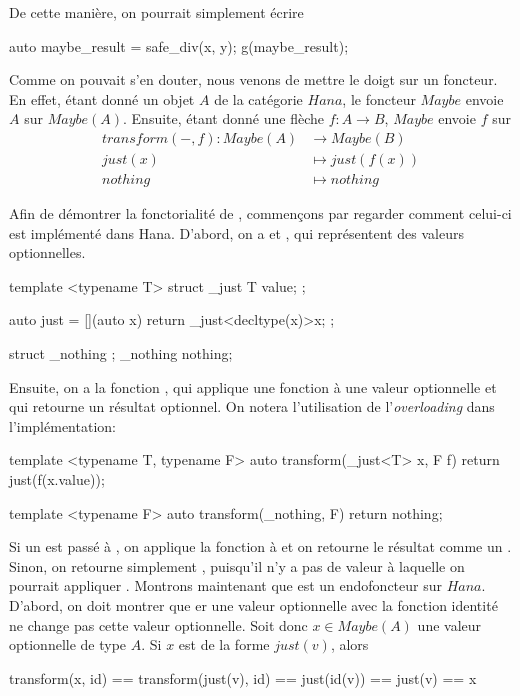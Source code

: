 De cette manière, on pourrait simplement écrire
\begin{cpp}
    auto maybe_result = safe_div(x, y);
    g(maybe_result);
\end{cpp}

Comme on pouvait s'en douter, nous venons de mettre le doigt sur un foncteur.
En effet, étant donné un objet $A$ de la catégorie $Hana$, le foncteur $Maybe$
envoie $A$ sur $Maybe(A)$. Ensuite, étant donné une flèche $f : A \to B$,
$Maybe$ envoie $f$ sur
\begin{align*}
    transform(-, f) : Maybe(A) &\to Maybe(B)        \\
                      just(x) &\mapsto just(f(x))   \\
                      nothing &\mapsto nothing
\end{align*}

Afin de démontrer la fonctorialité de , commençons par regarder
comment celui-ci est implémenté dans Hana. D'abord, on a  et
, qui représentent des valeurs optionnelles.
\begin{cpp}
    template <typename T>
    struct _just { T value; };

    auto just = [](auto x) {
        return _just<decltype(x)>{x};
    };

    struct _nothing { };
    _nothing nothing{};
\end{cpp}

Ensuite, on a la fonction , qui applique une fonction à une
valeur optionnelle et qui retourne un résultat optionnel. On notera
l'utilisation de l'\textit{overloading} dans l'implémentation:
\begin{cpp}
    template <typename T, typename F>
    auto transform(_just<T> x, F f) {
        return just(f(x.value));
    }

    template <typename F>
    auto transform(_nothing, F) {
        return nothing;
    }
\end{cpp}

Si un  est passé à , on applique la fonction
 à  et on retourne le résultat comme un . Sinon,
on retourne simplement , puisqu'il n'y a pas de valeur à
laquelle on pourrait appliquer . Montrons maintenant que 
est un endofoncteur sur $Hana$. D'abord, on doit montrer que er
une valeur optionnelle avec la fonction identité ne change pas cette valeur
optionnelle. Soit donc $x \in Maybe(A)$ une valeur optionnelle de type $A$.
Si $x$ est de la forme $just(v)$, alors
\begin{cpp}
    transform(x, id) == transform(just(v), id)
                     == just(id(v))
                     == just(v)
                     == x
\end{cpp}


